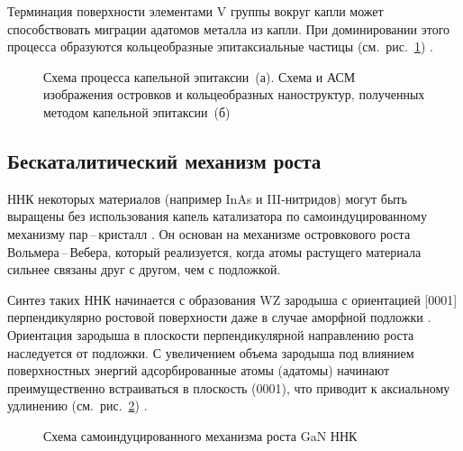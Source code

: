 Терминация поверхности элементами V группы вокруг капли может способствовать миграции адатомов металла из капли. При доминировании этого процесса образуются кольцеобразные эпитаксиальные частицы (см.~рис.~\cref{fig:Image_8_3}) \cite{Gurioli2019, mano2005}.

\begin{figure}[ht]
	\caption{Схема процесса капельной эпитаксии~(а). Схема и АСМ изображения островков и кольцеобразных наноструктур, полученных методом капельной эпитаксии~(б) \cite{Gurioli2019}}\label{fig:Image_8_3}
\end{figure}

\subsection{Бескаталитический механизм роста}\label{subsec:ch1/sec2/sub7}

ННК некоторых материалов (например InAs и III-нитридов) могут быть выращены без использования капель катализатора по самоиндуцированному механизму пар\,--\,кристалл \cite{Ristic2008, Bolshakov2014}. Он основан на механизме островкового роста Вольмера\,--\,Вебера, который реализуется, когда атомы растущего материала сильнее связаны друг с другом, чем с подложкой. 

Синтез таких ННК начинается с образования WZ зародыша с ориентацией [0001] перпендикулярно ростовой поверхности даже в случае аморфной подложки \cite{Stoica2008, Corfdir2009}. Ориентация зародыша в плоскости перпендикулярной направлению роста наследуется от подложки. С увеличением объема зародыша под влиянием поверхностных энергий адсорбированные атомы (адатомы) начинают преимущественно встраиваться в плоскость (0001), что приводит к аксиальному удлинению (см.~рис.~\cref{fig:Image_9}) \cite{Dubrovskii2012b}.

\begin{figure}[ht]
	\caption{Схема самоиндуцированного механизма роста GaN ННК \cite{Dubrovskii2012b}}\label{fig:Image_9}
\end{figure}

\FloatBarrier
